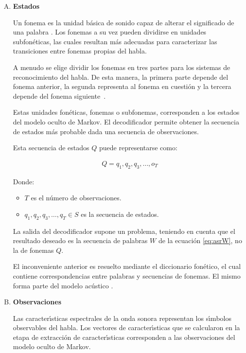 \begin{enumerate}[A)]
	\item \textbf{Estados}


	Un fonema es la unidad b\'asica de sonido capaz de alterar el significado de una 
	palabra \cite{Armbruster2003}. Los fonemas a su vez pueden dividirse en unidades subfon\'eticas,
	las cuales resultan m\'as adecuadas para caracterizar las transiciones entre fonemas propias 
	del habla.

	A menudo se elige dividir los fonemas en tres partes para los sistemas de reconocimiento del habla.
	De esta manera, la primera parte depende del fonema anterior, la segunda representa al fonema en
	cuesti\'on y la tercera depende del fonema \mbox{siguiente \cite{CMUConcepts}.}

	Estas unidades fon\'eticas, fonemas o subfonemas, corresponden a los estados del modelo 
	oculto de Markov. El decodificador permite obtener la secuencia de estados m\'as probable
	dada una secuencia de observaciones.
	
	Esta secuencia de estados $Q$ puede representarse como:

	\begin{align}
		Q = q_1,q_2,q_3,\ldots,o_T\label{eq:hmmQ}
	\end{align}

	Donde:
	\begin{itemize}
		\item $T$ es el n\'umero de observaciones.
		\item $q_1,q_2,q_3,\ldots,q_T \in S$ es la secuencia de estados.
	\end{itemize}

	La salida del decodificador supone un problema, teniendo en cuenta que el resultado deseado es la secuencia 
	de palabras $W$ de la ecuaci\'on \ref{eq:asrW}, no la de fonemas $Q$.

	El inconveniente anterior es resuelto mediante el diccionario fon\'etico, el cual contiene correspondencias 
	entre palabras y secuencias de fonemas. El mismo forma parte del modelo ac\'ustico \cite{huang-handbook10}.

	\item \textbf{Observaciones}


	Las caracter{\'\i}sticas espectrales de la onda sonora representan los s{\'\i}mbolos observables 
	del habla. Los vectores de caracter{\'\i}sticas que se calcularon en la etapa de extracci\'on 
	de caracter{\'\i}sticas corresponden a las observaciones del modelo oculto de Markov.


\end{enumerate}
